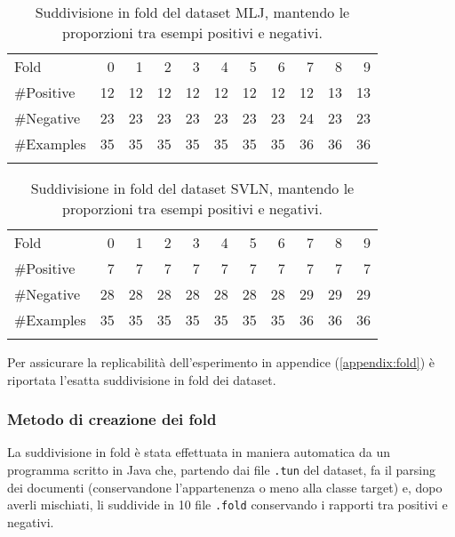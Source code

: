 \begin{table}[H]
	\centering
		\begin{tabular}{l@{\qquad}*{10}{r}}
		\toprule
\addlinespace
			Fold &  0 &  1 &  2 &  3 &  4 &  5 &  6 &  7 &  8 &  9 \\
\addlinespace
\midrule
\addlinespace
\#Positive  & 12  & 12  &  12 &  12 &  12 &  12 &  12 &  12 & 13 & 13 \\
\#Negative  & 23 & 23 & 23 & 23 & 23 & 23 & 23 & 24 & 23 & 23 \\
\#Examples  & 35 & 35 & 35 & 35 & 35 & 35 & 35 & 36 & 36 & 36 \\
\addlinespace
\bottomrule
		\end{tabular}
\caption[MLJ: suddivisione in fold.]{Suddivisione in fold del dataset MLJ, mantendo le proporzioni tra esempi positivi e negativi.}
	\label{tab:MLJ}
\end{table}

\begin{table}[H]
	\centering
		\begin{tabular}{l@{\qquad}*{10}{r}}
		\toprule
\addlinespace
			Fold &  0 &  1 &  2 &  3 &  4 &  5 &  6 &  7 &  8 &  9 \\
\addlinespace
\midrule
\addlinespace
\#Positive & 7  & 7  &  7 &  7 &  7 &  7 &  7 &  7 &  7 &  7 \\
\#Negative & 28 & 28 & 28 & 28 & 28 & 28 & 28 & 29 & 29 & 29 \\
\#Examples & 35 & 35 & 35 & 35 & 35 & 35 & 35 & 36 & 36 & 36 \\
\addlinespace
\bottomrule
		\end{tabular}
\caption[SVLN: suddivisione in fold.]{Suddivisione in fold del dataset SVLN, mantendo le proporzioni tra esempi positivi e negativi.}
	\label{tab:SVLN}
\end{table}

Per assicurare la replicabilità dell'esperimento in appendice (\ref{appendix:fold}) è riportata l'esatta suddivisione in fold dei dataset.

\subsubsection{Metodo di creazione dei fold}
La suddivisione in fold è stata effettuata in maniera automatica da un programma scritto in Java che, partendo dai file \verb+.tun+ del dataset, fa il parsing dei documenti (conservandone l'appartenenza o meno alla classe target) e, dopo averli mischiati, li suddivide in 10 file \verb+.fold+ conservando i rapporti tra positivi e negativi.